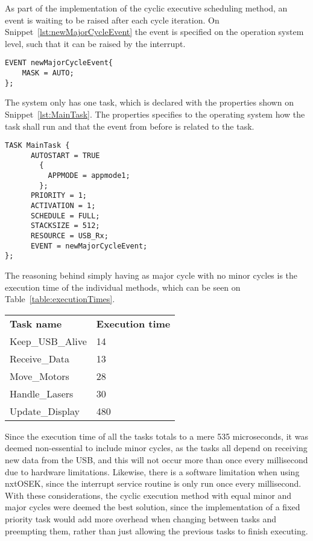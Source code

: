 As part of the implementation of the cyclic executive scheduling method, an event is waiting to be raised after each cycle iteration. 
On Snippet~\ref{lst:newMajorCycleEvent} the event is specified on the operation system level, such that it can be raised by the interrupt. 
\begin{lstlisting}[language=CSharp,label={lst:newMajorCycleEvent},caption={newMajorCycleEvent event from nxt.oil}]
EVENT newMajorCycleEvent{
    MASK = AUTO;
};
\end{lstlisting}

The system only has one task, which is declared with the properties shown on Snippet~\ref{lst:MainTask}. 
The properties specifies to the operating system how the task shall run and that the event from before is related to the task.
\begin{lstlisting}[language=CSharp,label={lst:MainTaskoil},caption={MainTaks task from nxt.oil}]
    TASK MainTask {
      AUTOSTART = TRUE 
        {
          APPMODE = appmode1;
        };
      PRIORITY = 1;
      ACTIVATION = 1;
      SCHEDULE = FULL;
      STACKSIZE = 512;
      RESOURCE = USB_Rx;
      EVENT = newMajorCycleEvent;
};
\end{lstlisting}

The reasoning behind simply having as major cycle with no minor cycles is the execution time of the individual methods, which can be seen on Table~\ref{table:executionTimes}.

\begin{table}[tbp]
\begin{tabular}{ll}
\textbf{Task name}  & \textbf{Execution time} \\
Keep\_USB\_Alive    & 14                            \\
Receive\_Data       & 13                            \\
Move\_Motors        & 28                            \\
Handle\_Lasers      & 30                            \\
Update\_Display     & 480                           \\                     
\end{tabular}
\end{table}\label{table:executionTimes}

Since the execution time of all the tasks totals to a mere 535 microseconds, it was deemed non-essential to include minor cycles, as the tasks all depend on receiving new data from the USB, and this will not occur more than once every millisecond due to hardware limitations.
Likewise, there is a software limitation when using nxtOSEK, since the interrupt service routine is only run once every millisecond.
With these considerations, the cyclic execution method with equal minor and major cycles were deemed the best solution, since the implementation of a fixed priority task would add more overhead when changing between tasks and preempting them, rather than just allowing the previous tasks to finish executing.

